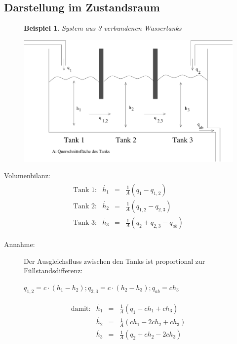\message{ !name(Mitschrieb_SysRegel.tex)}\documentclass[12pt,a4paper,ngerman]{scrartcl}
\newtheorem{bsp}{Beispiel}[section] %
\begin{document}
\subsection{Darstellung im Zustandsraum}

\begin{figure}[H]
\begin{bsp}
System aus 3 verbundenen Wassertanks
\end{bsp}
  \centering
  \includegraphics[width=.9\linewidth]{sysregel_bsp_2,2}
\end{figure}
Volumenbilanz:
\begin{align*}
  \begin{array}{llll}
    \text{Tank 1:}&\dot{h_1}&=&\frac{1}{A}(q_1-q_{1,2})\\
    \text{Tank 2:}&\dot{h_2}&=&\frac{1}{A}(q_{1,2}-q_{2,3})\\
    \text{Tank 3:}&\dot{h_3}&=&\frac{1}{A}(q_{2}+q_{2,3}-q_{ab})
  \end{array}
\end{align*}
\begin{description}
\item[Annahme:]Der Ausgleichsfluss zwischen den Tanks ist proportional zur Füllstandsdifferenz: \begin{center}  $q_{1,2}=c\cdot (h_1-h_2);q_{2,3}=c\cdot (h_2-h_3);q_{ab}=ch_3$ \end{center}
\end{description}
\begin{align*}
  \begin{array}{llll}
    \text{damit:}&\dot{h_1}&=&\frac{1}{A}(q_1-ch_1+ch_3)\\
                 &\dot{h_2}&=&\frac{1}{A}(ch_1-2ch_2+ch_3)\\
                 &\dot{h_3}&=&\frac{1}{A}(q_2+ch_2-2ch_3)
  \end{array}
\end{align*}
\end{document}
